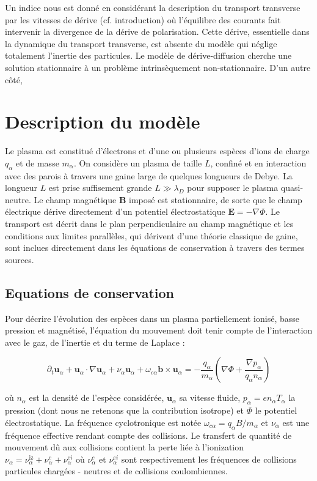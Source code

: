 \begin{refsection}
Un indice nous est donné en considérant la description du transport transverse
par les vitesses de dérive (cf.
introduction) où l'équilibre des courants fait intervenir la divergence de la
dérive de polarisation. Cette dérive, essentielle dans la dynamique du transport
transverse, est absente du modèle qui néglige totalement l'inertie des
particules. Le modèle de dérive-diffusion cherche une solution stationnaire à un
problème intrinsèquement non-stationnaire.
\parencite{Fruchtman}
\parencite{Sternberg}
D'un autre côté,

\section{Description du modèle}
Le plasma est constitué d'électrons et d'une ou plusieurs espèces d'ions de
charge $q_\alpha$ et de masse $m_\alpha$. On considère un plasma de taille $L$,
confiné et en interaction avec des parois à travers une gaine large de quelques longueurs
de Debye. La longueur $L$ est prise suffisement grande $L\gg\lambda_D$ pour
supposer le plasma quasi-neutre. Le champ magnétique $\mathbf{B}$ imposé est 
stationnaire, de sorte que le champ électrique dérive directement d'un 
potentiel électrostatique $\mathbf{E}=-\nabla \Phi$. Le transport est décrit
dans le plan perpendiculaire au champ magnétique et les conditions aux limites
parallèles, qui dérivent d'une théorie classique de gaine, sont
inclues directement dans les équations de conservation à travers des termes
sources.

\subsection{Equations de conservation}
Pour décrire l'évolution des espèces dans un plasma partiellement ionisé, basse
pression et magnétisé, l'équation du mouvement doit tenir compte de
l'interaction avec le gaz, de l'inertie et du terme de Laplace :

\begin{equation}
\partial_t \mathbf{u}_\alpha + \mathbf{u}_\alpha\cdot\nabla\mathbf{u}_\alpha+
\nu_\alpha\mathbf{u}_\alpha+\omega_{c\alpha}\mathbf{b}\times\mathbf{u}_\alpha=
-\frac{q_\alpha}{m_\alpha}\left(\nabla \Phi+\frac{\nabla
p_\alpha}{q_\alpha n_\alpha}\right)
\end{equation}

où $n_\alpha$ est la densité de l'espèce considérée, $\mathbf{u}_\alpha$ sa
vitesse fluide, $p_\alpha =en_\alpha T_\alpha$ la pression (dont nous ne
retenons que la contribution isotrope) et $\Phi$ le potentiel électrostatique. La fréquence
cyclotronique est notée $\omega_{c\alpha}=q_\alpha B/m_\alpha$ et $\nu_\alpha$
est une fréquence effective rendant compte des collisions.
Le transfert de quantité de mouvement dû aux collisions contient la perte liée à
l'ionization
$\nu_\alpha=\nu_{\alpha}^\text{iz}+\nu_{\alpha}^{c}+\nu_{\alpha}^{ei}$ où
$\nu_{\alpha}^{c}$ et $\nu_{\alpha}^{ei}$ sont respectivement les
fréquences de collisions particules chargées - neutres et de collisions
coulombiennes.


\end{refsection}

